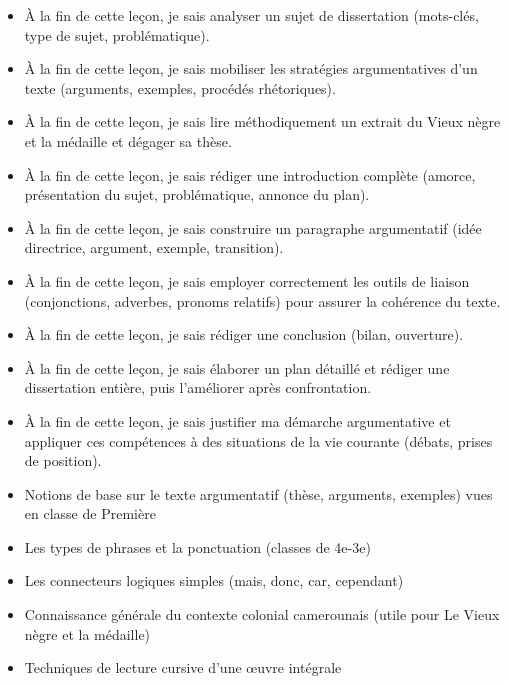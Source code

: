 \documentclass[11pt]{article}
\begin{document}
\begin{objectifs}
\begin{itemize}
\item À la fin de cette leçon, je sais analyser un sujet de dissertation (mots-clés, type de sujet, problématique).
\item À la fin de cette leçon, je sais mobiliser les stratégies argumentatives d'un texte (arguments, exemples, procédés rhétoriques).
\item À la fin de cette leçon, je sais lire méthodiquement un extrait du Vieux nègre et la médaille et dégager sa thèse.
\item À la fin de cette leçon, je sais rédiger une introduction complète (amorce, présentation du sujet, problématique, annonce du plan).
\item À la fin de cette leçon, je sais construire un paragraphe argumentatif (idée directrice, argument, exemple, transition).
\item À la fin de cette leçon, je sais employer correctement les outils de liaison (conjonctions, adverbes, pronoms relatifs) pour assurer la cohérence du texte.
\item À la fin de cette leçon, je sais rédiger une conclusion (bilan, ouverture).
\item À la fin de cette leçon, je sais élaborer un plan détaillé et rédiger une dissertation entière, puis l'améliorer après confrontation.
\item À la fin de cette leçon, je sais justifier ma démarche argumentative et appliquer ces compétences à des situations de la vie courante (débats, prises de position).
\end{itemize}
\end{objectifs}

\begin{prerequis}
\begin{itemize}
\item Notions de base sur le texte argumentatif (thèse, arguments, exemples) vues en classe de Première
\item Les types de phrases et la ponctuation (classes de 4e-3e)
\item Les connecteurs logiques simples (mais, donc, car, cependant)
\item Connaissance générale du contexte colonial camerounais (utile pour Le Vieux nègre et la médaille)
\item Techniques de lecture cursive d'une œuvre intégrale
\end{itemize}
\end{prerequis}
\end{document}
